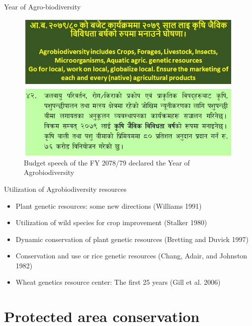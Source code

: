 \documentclass[
  ignorenonframetext,
  aspectratio=169]{beamer}
\providecommand{\tightlist}{%
  \setlength{\itemsep}{0pt}\setlength{\parskip}{0pt}}
\begin{document}
\begin{frame}{Year of Agro-biodiversity}
\protect\hypertarget{year-of-agro-biodiversity}{}
\begin{figure}
\includegraphics[width=0.7\linewidth]{./../images/budget_speech_year2078_79_of_agro_biodiversity} \caption{Budget speech of the FY 2078/79 declared the Year of Agrobiodiversity}\label{fig:year-of-agrobiodiversity207879}
\end{figure}
\end{frame}

\begin{frame}{Utilization of Agrobiodiversity resources}
\protect\hypertarget{utilization-of-agrobiodiversity-resources}{}
\begin{itemize}
\tightlist
\item
  Plant genetic resources: some new directions (Williams 1991)
\item
  Utilization of wild species for crop improvement (Stalker 1980)
\item
  Dynamic conservation of plant genetic resources (Bretting and Duvick
  1997)
\item
  Conservation and use or rice genetic resources (Chang, Adair, and
  Johnston 1982)
\item
  Wheat genetics resource center: The first 25 years (Gill et al. 2006)
\end{itemize}
\end{frame}

\hypertarget{protected-area-conservation}{%
\section{Protected area
conservation}\label{protected-area-conservation}}
\end{document}
